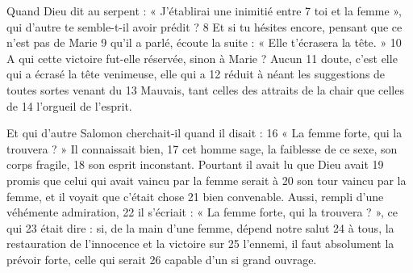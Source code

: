 Quand Dieu dit au serpent : « J'établirai une inimitié entre	 
7	 	toi et la femme », qui d'autre te semble-t-il avoir prédit ?	 
8	 	Et si tu hésites encore, pensant que ce n'est pas de Marie	 
9	 	qu'il a parlé, écoute la suite : « Elle t'écrasera la tête. »	 
10	 	A qui cette victoire fut-elle réservée, sinon à Marie ? Aucun	 
11	 	doute, c'est elle qui a écrasé la tête venimeuse, elle qui a	 
12	 	réduit à néant les suggestions de toutes sortes venant du	 
13	 	Mauvais, tant celles des attraits de la chair que celles de	 
14	 	l'orgueil de l'esprit.

Et qui d'autre Salomon cherchait-il quand il disait :	 
16	 	« La femme forte, qui la trouvera ? » Il connaissait bien,	 
17	 	cet homme sage, la faiblesse de ce sexe, son corps fragile,	 
18	 	son esprit inconstant. Pourtant il avait lu que Dieu avait	 
19	 	promis que celui qui avait vaincu par la femme serait à	 
20	 	son tour vaincu par la femme, et il voyait que c'était chose	 
21	 	bien convenable. Aussi, rempli d'une véhémente admiration,	 
22	 	il s'écriait : « La femme forte, qui la trouvera ? », ce qui	 
23	 	était dire : si, de la main d'une femme, dépend notre salut	 
24	 	à tous, la restauration de l'innocence et la victoire sur	 
25	 	l'ennemi, il faut absolument la prévoir forte, celle qui serait	 
26	 	capable d'un si grand ouvrage.
